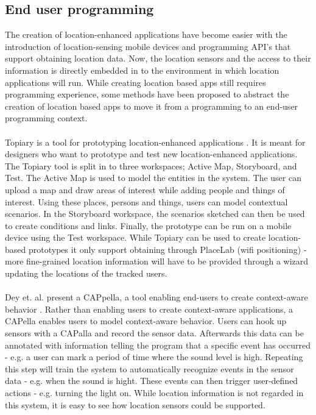 \subsection{End user programming} %
\label{sub:end_user_programming}
The creation of location-enhanced applications have become easier with the introduction of location-sensing mobile devices and programming API's that support obtaining location data. Now, the location sensors and the access to their information is directly embedded in to the environment in which location applications will run. While creating location based apps still requires programming experience, some methods have been proposed to abstract the creation of location based apps to move it from a programming to an end-user programming context. 
\\\\
Topiary is a tool for prototyping location-enhanced applications \cite{Li:2004:TTP:1029632.1029671}. It is meant for designers who want to prototype and test new location-enhanced applications. The Topiary tool is split in to three workspaces; Active Map, Storyboard, and Test. The Active Map is used to model the entities in the system. The user can upload a map and draw areas of interest while adding people and things of interest. Using these places, persons and things, users can model contextual scenarios. In the Storyboard workspace, the scenarios sketched can then be used to create conditions and links. Finally, the prototype can be run on a mobile device using the Test workspace. While Topiary can be used to create location-based prototypes it only support obtaining through PlaceLab (wifi positioning) - more fine-grained location information will have to be provided through a wizard updating the locations of the tracked users. 
\\\\
Dey et. al. present a CAPpella, a tool enabling end-users to create context-aware behavior \cite{Dey:2004:CPD:985692.985697}. Rather than enabling users to create context-aware applications, a CAPella enables users to model context-aware behavior. Users can hook up sensors with a CAPalla and record the sensor data. Afterwards this data can be annotated with information telling the program that a specific event has occurred - e.g. a user can mark a period of time where the sound level is high. Repeating this step will train the system to automatically recognize events in the sensor data - e.g. when the sound is hight. These events can then trigger user-defined actions - e.g. turning the light on. While location information is not regarded in this system, it is easy to see how location sensors could be supported.
